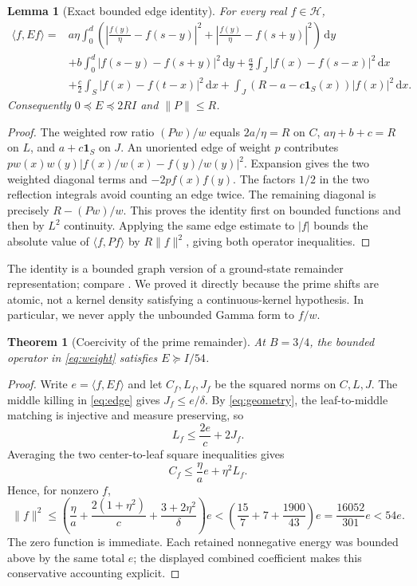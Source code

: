 \documentclass[11pt]{article}
\newtheorem{theorem}{Theorem}
\newtheorem{lemma}{Lemma}
\newcommand{\dd}{\,\mathrm d}
\newcommand{\norm}[1]{\lVert#1\rVert}
\newcommand{\ip}[2]{\langle#1,#2\rangle}
\newcommand{\ind}{\mathbf1}
\newcommand{\HH}{\mathcal H}
\begin{document}
\begin{lemma}[Exact bounded edge identity]\label{lem:edge}
For every real $f\in\HH$,
\begin{align}
 \ip f{Ef}={}&a\eta\int_0^d\left(
 \left|\frac{f(y)}\eta-f(s-y)\right|^2+
 \left|\frac{f(y)}\eta-f(s+y)\right|^2\right)\dd y\nonumber\\
 &+b\int_0^d|f(s-y)-f(s+y)|^2\dd y
 +\frac a2\int_J|f(x)-f(s-x)|^2\dd x\nonumber\\
 &+\frac c2\int_S|f(x)-f(t-x)|^2\dd x
 +\int_J\left(R-a-c\ind_S(x)\right)|f(x)|^2\dd x.\label{eq:edge}
\end{align}
Consequently $0\preceq E\preceq2RI$ and $\norm P\le R$.
\end{lemma}
\begin{proof}
The weighted row ratio $(Pw)/w$ equals $2a/\eta=R$ on $C$, $a\eta+b+c=R$ on $L$, and $a+c\ind_S$ on $J$. An unoriented edge of weight $p$ contributes
$pw(x)w(y)|f(x)/w(x)-f(y)/w(y)|^2$.
Expansion gives the two weighted diagonal terms and $-2pf(x)f(y)$. The factors $1/2$ in the two reflection integrals avoid counting an edge twice. The remaining diagonal is precisely $R-(Pw)/w$. This proves the identity first on bounded functions and then by $L^2$ continuity. Applying the same edge estimate to $|f|$ bounds the absolute value of $\ip f{Pf}$ by $R\norm f^2$, giving both operator inequalities.
\end{proof}

The identity is a bounded graph version of a ground-state remainder representation; compare \cite[Proposition 2.3 and Remark 2.4]{FS}. We proved it directly because the prime shifts are atomic, not a kernel density satisfying a continuous-kernel hypothesis. In particular, we never apply the unbounded Gamma form to $f/w$.

\begin{theorem}[Coercivity of the prime remainder]\label{thm:gap}
At $B=3/4$, the bounded operator in \eqref{eq:weight} satisfies $E\succeq I/54$.
\end{theorem}
\begin{proof}
Write $e=\ip f{Ef}$ and let $C_f,L_f,J_f$ be the squared norms on $C,L,J$. The middle killing in \eqref{eq:edge} gives $J_f\le e/\delta$. By \eqref{eq:geometry}, the leaf-to-middle matching is injective and measure preserving, so
\[
 L_f\le\frac{2e}{c}+2J_f.
\]
Averaging the two center-to-leaf square inequalities gives
\[
 C_f\le\frac\eta a e+\eta^2L_f.
\]
Hence, for nonzero $f$,
\[
 \norm f^2\le\left(\frac\eta a+\frac{2(1+\eta^2)}c+
                    \frac{3+2\eta^2}\delta\right)e
 <\left(\frac{15}{7}+7+\frac{1900}{43}\right)e
 =\frac{16052}{301}e<54e.
\]
The zero function is immediate. Each retained nonnegative energy was bounded above by the same total $e$; the displayed combined coefficient makes this conservative accounting explicit.
\end{proof}
\end{document}
